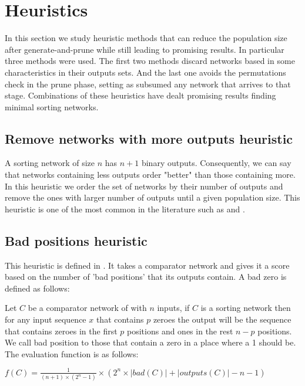 \documentclass[../main.tex]{subfiles}
\begin{document}
	\section{Heuristics}
	In this section we study heuristic methods that can reduce the population size after generate-and-prune while still leading to promising results. In particular three methods were used. The first two methods discard networks based in some characteristics in their outputs sets. And the last one avoids the permutations check in the prune phase, setting as subsumed any network that arrives to that stage. Combinations of these heuristics have dealt promising results finding minimal sorting networks.
	
	\subsection{Remove networks with more outputs heuristic}
	A sorting network of size $n$ has $n+1$ binary outputs. Consequently, we can say that networks containing less outputs order "better" than those containing more. In this heuristic we order the set of networks by their number of outputs and remove the ones with larger number of outputs until a given population size. This heuristic is one of the most common in the literature such as \cite{Sekanina2005} and \cite{SortingNetworkIsomorphism}.
	
	\subsection{Bad positions heuristic}
	This heuristic is defined in \cite{FRASINARU2019447}. It takes a comparator network and gives it a score based on the number of 'bad positions' that its outputs contain. A bad zero is defined as follows:
	
	Let $C$ be a comparator network of with $n$ inputs, if $C$ is a sorting network then for any input sequence $x$ that contains $p$ zeroes the output will be the sequence that contains zeroes in the first $p$ positions and ones in the rest $n-p$ positions. We call bad position to those that contain a zero in a place where a 1 should be. The evaluation function is as follows:
	
	$f(C)=\frac{1}{(n+1)\times(2^n-1)}\times(2^n \times |bad(C)| + |outputs(C)| - n -1)$
	
\end{document}
